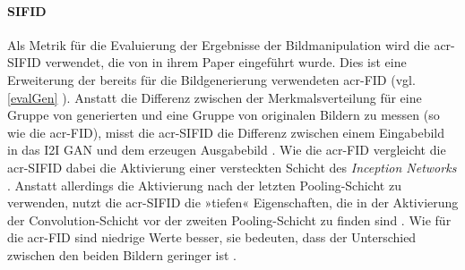  \paragraph{SIFID} Als Metrik für die Evaluierung der Ergebnisse der
 Bildmanipulation wird die \gls{acr-SIFID} verwendet, die von
 \citeauthor{shaham2019singan} in ihrem Paper 
 \cite{shaham2019singan} eingeführt wurde. Dies ist eine Erweiterung der bereits
 für die Bildgenerierung verwendeten \gls{acr-FID} \cite{heusel2017gans} (vgl.
 \cref{evalGen} %
 ). Anstatt die Differenz zwischen der Merkmalsverteilung für eine
 Gruppe von generierten und eine Gruppe von originalen Bildern zu messen (so wie
 die \gls{acr-FID}), misst die \gls{acr-SIFID} die Differenz zwischen einem
 Eingabebild in das I2I GAN und dem erzeugen Ausgabebild
 \cite[S. 4575]{shaham2019singan}. Wie die \gls{acr-FID} vergleicht die
 \gls{acr-SIFID} dabei die Aktivierung einer versteckten Schicht des
 \emph{Inception Networks} \cite{szegedy2015going}.
 Anstatt allerdings die
 Aktivierung nach der letzten Pooling-Schicht zu verwenden, nutzt die
 \gls{acr-SIFID} die »tiefen« Eigenschaften, die in der Aktivierung der
 Convolution-Schicht vor der zweiten Pooling-Schicht zu finden sind \cite[S.
 4575]{shaham2019singan}. Wie für die \gls{acr-FID} sind niedrige Werte besser,
 sie bedeuten, dass der Unterschied zwischen den beiden Bildern geringer ist
 \cite[S. 5]{pang2021image}.